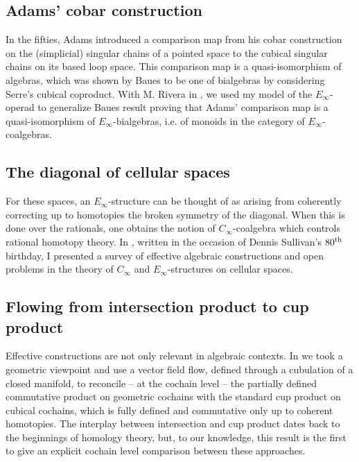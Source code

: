\subsection{Adams' cobar construction}

In the fifties, Adams introduced a comparison map from his cobar construction on the (simplicial) singular chains of a pointed space to the cubical singular chains on its based loop space.
This comparison map is a quasi-isomorphism of algebras, which was shown by Baues to be one of bialgebras by considering Serre's cubical coproduct.
With M. Rivera in \cite{medina2021cobar}, we used my model of the $E_\infty$-operad to generalize Baues result proving that Adams' comparison map is a quasi-isomorphism of $E_{\infty}$-bialgebras, i.e. of monoids in the category of $E_{\infty}$-coalgebras.

\subsection{The diagonal of cellular spaces}

For these spaces, an $E_\infty$-structure can be thought of as arising from coherently correcting up to homotopies the broken symmetry of the diagonal.
When this is done over the rationals, one obtains the notion of $C_\infty$-coalgebra which controls rational homotopy theory.
In \cite{medina2022dennis}, written in the occasion of Dennis Sullivan's $80^{\mathrm{th}}$ birthday, I presented a survey of effective algebraic constructions and open problems in the theory of $C_\infty$ and $E_\infty$-structures on cellular spaces.

\subsection{Flowing from intersection product to cup product} \label{ss:flowing}

Effective constructions are not only relevant in algebraic contexts.
In \cite{medina2021flowing} we took a geometric viewpoint and use a vector field flow, defined through a cubulation of a closed manifold, to reconcile -- at the cochain level -- the partially defined commutative product on geometric cochains with the standard cup product on cubical cochains, which is fully defined and commutative only up to coherent homotopies. The interplay between intersection and cup product dates back to the beginnings of homology theory, but, to our knowledge, this result is the first to give an explicit cochain level comparison between these approaches.

